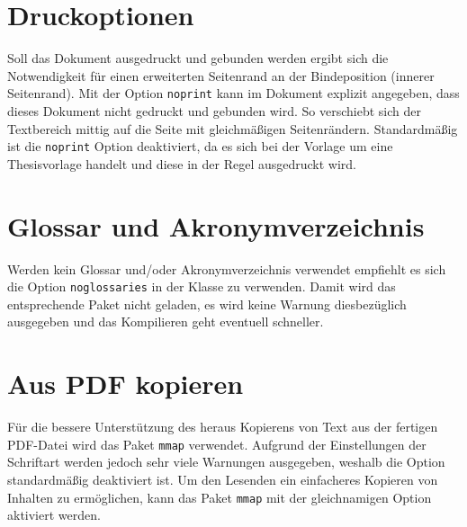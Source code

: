 
\section{Druckoptionen}
Soll das Dokument ausgedruckt und gebunden werden ergibt sich die Notwendigkeit für einen erweiterten Seitenrand an der Bindeposition (innerer Seitenrand). Mit der Option \texttt{noprint} kann im Dokument explizit angegeben, dass dieses Dokument nicht gedruckt und gebunden wird. So verschiebt sich der Textbereich mittig auf die Seite mit gleichmäßigen Seitenrändern. Standardmäßig ist die \texttt{noprint} Option deaktiviert, da es sich bei der Vorlage um eine Thesisvorlage handelt und diese in der Regel ausgedruckt wird.


\section{Glossar und Akronymverzeichnis}
Werden kein Glossar und/oder Akronymverzeichnis verwendet empfiehlt es sich die Option \texttt{noglossaries} in der Klasse zu verwenden. Damit wird das entsprechende Paket nicht geladen, es wird keine Warnung diesbezüglich ausgegeben und das Kompilieren geht eventuell schneller.


\section{Aus PDF kopieren}
Für die bessere Unterstützung des heraus Kopierens von Text aus der fertigen PDF-Datei wird das Paket \texttt{mmap} verwendet. Aufgrund der Einstellungen der Schriftart werden jedoch sehr viele Warnungen ausgegeben, weshalb die Option standardmäßig deaktiviert ist. Um den Lesenden ein einfacheres Kopieren von Inhalten zu ermöglichen, kann das Paket \texttt{mmap} mit der gleichnamigen Option aktiviert werden.

